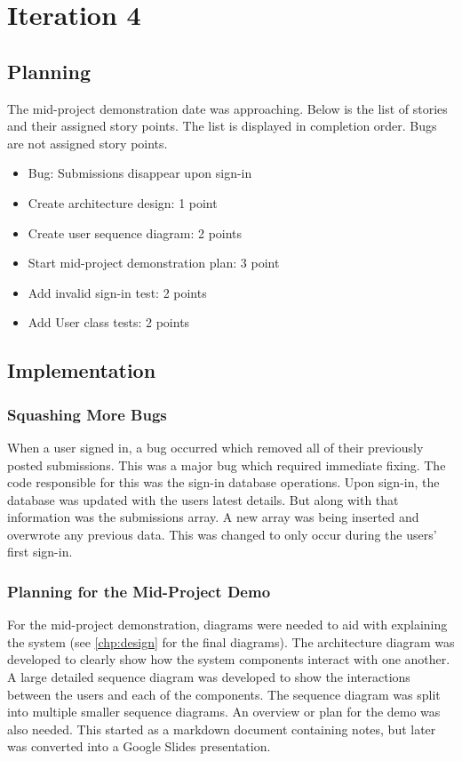 \chapter{Iteration 4}
\section{Planning}
The mid-project demonstration date was approaching. Below is the list of stories and their assigned story points. The list is displayed in completion order. Bugs are not assigned story points.

\begin{itemize}
\item Bug: Submissions disappear upon sign-in
\item Create architecture design: 1 point
\item Create user sequence diagram: 2 points
\item Start mid-project demonstration plan: 3 point
\item Add invalid sign-in test: 2 points
\item Add User class tests: 2 points
\end{itemize}

\section{Implementation}
\subsection{Squashing More Bugs}
When a user signed in, a bug occurred which removed all of their previously posted submissions. This was a major bug which required immediate fixing. The code responsible for this was the sign-in database operations. Upon sign-in, the database was updated with the users latest details. But along with that information was the submissions array. A new array was being inserted and overwrote any previous data. This was changed to only occur during the users' first sign-in.

\subsection{Planning for the Mid-Project Demo}
For the mid-project demonstration, diagrams were needed to aid with explaining the system (see \autoref{chp:design} for the final diagrams). The architecture diagram was developed to clearly show how the system components interact with one another. A large detailed sequence diagram was developed to show the interactions between the users and each of the components. The sequence diagram was split into multiple smaller sequence diagrams. An overview or plan for the demo was also needed. This started as a markdown document containing notes, but later was converted into a Google Slides presentation.

